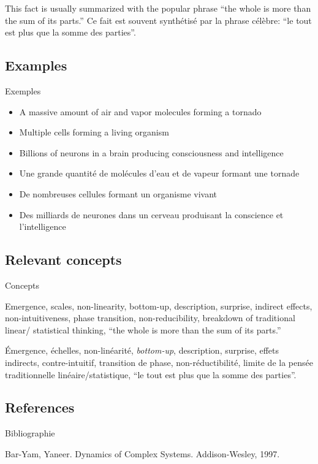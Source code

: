 \documentclass[12pt]{article}
\begin{document}
This fact is usually summarized with the popular phrase ``the whole is more than the sum of its parts.''
Ce fait est souvent synthétisé par la phrase célèbre: ``le tout est plus que la somme des parties''.


\subsection*{Examples}{Exemples}

\begin{itemize}
	\item A massive amount of air and vapor molecules forming a tornado
	\item Multiple cells forming a living organism
	\item Billions of neurons in a brain producing consciousness and intelligence
\end{itemize}

\begin{itemize}
	\item Une grande quantité de molécules d'eau et de vapeur formant une tornade
	\item De nombreuses cellules formant un organisme vivant
	\item Des milliards de neurones dans un cerveau produisant la conscience et l'intelligence
\end{itemize}

\subsection*{Relevant concepts}{Concepts}

Emergence, scales, non-linearity, bottom-up, description, surprise, indirect effects, non-intuitiveness, phase transition, non-reducibility, breakdown of traditional linear/ statistical thinking, ``the whole is more than the sum of its parts.''

Émergence, échelles, non-linéarité, \textit{bottom-up}, description, surprise, effets indirects, contre-intuitif, transition de phase, non-réductibilité, limite de la pensée traditionnelle linéaire/statistique, ``le tout est plus que la somme des parties''.


\subsection*{References}{Bibliographie}


Bar-Yam, Yaneer. Dynamics of Complex Systems. Addison-Wesley, 1997.
\end{document}
